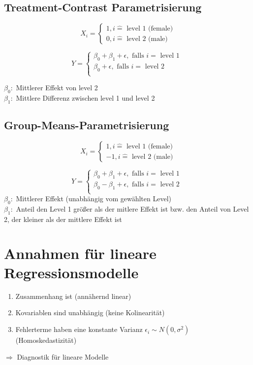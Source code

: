 \documentclass[10pt]{report}
\theoremstyle{definition}
\begin{document}
\subsection{Treatment-Contrast Parametrisierung}
\[ X_i = \begin{cases}
		1, i \hat{=} \text{ level 1 (female)} \\
		0, i \hat{=} \text{ level 2 (male)}
\end{cases} \]

\[ Y = \begin{cases}
		\beta_0 + \beta_1 + \epsilon, \text{ falls } i = \text{ level 1 } \\
		\beta_0 + \epsilon, \text{ falls } i = \text{ level 2 } \\
\end{cases} \]

$\beta_0:$ Mittlerer Effekt von level 2\\
$\beta_1:$ Mittlere Differenz zwischen level 1 und level 2\\

\subsection{Group-Means-Parametrisierung}
\[ X_i = \begin{cases}
		1, i \hat{=} \text{ level 1 (female)} \\
		-1, i \hat{=} \text{ level 2 (male)}
\end{cases} \]

\[ Y = \begin{cases}
		\beta_0 + \beta_1 + \epsilon, \text{ falls } i = \text{ level 1 } \\
		\beta_0 - \beta_1 + \epsilon, \text{ falls } i = \text{ level 2 } \\
\end{cases} \]
$\beta_0:$ Mittlerer Effekt (unabhängig vom gewählten Level)\\
$\beta_1:$ Anteil den Level 1 größer als der mitlere Effekt ist bzw. den Anteil von Level 2, der kleiner als der mittlere Effekt ist\\

\section{Annahmen für lineare Regressionsmodelle}
\begin{enumerate}
	\item Zusammenhang ist (annähernd linear)
	\item Kovariablen sind unabhängig (keine Kolinearität)
	\item Fehlerterme haben eine konstante Varianz $\epsilon_i \sim N(0, \sigma^{2} )$ (Homoskedastizität)
\end{enumerate}
$\Rightarrow$ Diagnostik für lineare Modelle
\end{document}
